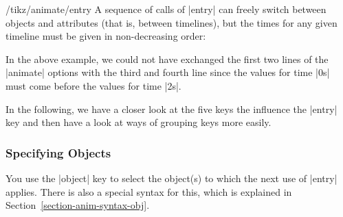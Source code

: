 \begin{key}{/tikz/animate/entry}
    A sequence of calls of |entry| can freely switch between objects and
    attributes (that is, between timelines), but the times for any given
    timeline must be given in non-decreasing order:
\begin{codeexample}[
    preamble={\usetikzlibrary{animations}},
    animation list={0.5,1,1.5,2},
]
\end{codeexample}
    In the above example, we could not have exchanged the first two lines of
    the |animate| options with the third and fourth line since the values for
    time |0s| must come before the values for time |2s|.
\end{key}

In the following, we have a closer look at the five keys the influence the
|entry| key and then have a look at ways of grouping keys more easily.


\subsubsection{Specifying Objects}
\label{section-anim-def-obj}

You use the |object| key to select the object(s) to which the next use of
|entry| applies. There is also a special syntax for this, which is explained in
Section~\ref{section-anim-syntax-obj}.

